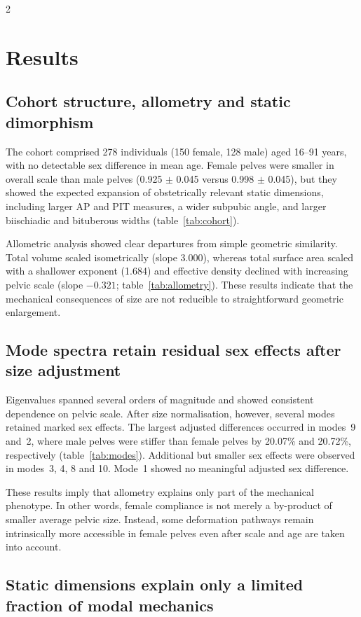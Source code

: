 \documentclass[openacc]{rsproca_new}
\begin{document}
\begin{multicols}{2}
\section{Results}

\subsection{Cohort structure, allometry and static dimorphism}

The cohort comprised 278 individuals (150 female, 128 male) aged 16--91 years, with no detectable sex difference in mean age. Female pelves were smaller in overall scale than male pelves (0.925 $\pm$ 0.045 versus 0.998 $\pm$ 0.045), but they showed the expected expansion of obstetrically relevant static dimensions, including larger AP and PIT measures, a wider subpubic angle, and larger biischiadic and bituberous widths (table~\ref{tab:cohort}).

Allometric analysis showed clear departures from simple geometric similarity. Total volume scaled isometrically (slope 3.000), whereas total surface area scaled with a shallower exponent (1.684) and effective density declined with increasing pelvic scale (slope $-0.321$; table~\ref{tab:allometry}). These results indicate that the mechanical consequences of size are not reducible to straightforward geometric enlargement.

\subsection{Mode spectra retain residual sex effects after size adjustment}

Eigenvalues spanned several orders of magnitude and showed consistent dependence on pelvic scale. After size normalisation, however, several modes retained marked sex effects. The largest adjusted differences occurred in modes~9 and~2, where male pelves were stiffer than female pelves by 20.07\% and 20.72\%, respectively (table~\ref{tab:modes}). Additional but smaller sex effects were observed in modes~3, 4, 8 and 10. Mode~1 showed no meaningful adjusted sex difference.

These results imply that allometry explains only part of the mechanical phenotype. In other words, female compliance is not merely a by-product of smaller average pelvic size. Instead, some deformation pathways remain intrinsically more accessible in female pelves even after scale and age are taken into account.

\subsection{Static dimensions explain only a limited fraction of modal mechanics}


\end{multicols}
\end{document}
